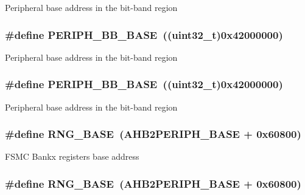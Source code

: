 Peripheral base address in the bit-\/band region \hypertarget{group___peripheral__memory__map_gaed7efc100877000845c236ccdc9e144a}{
\subsubsection[{P\-E\-R\-I\-P\-H\-\_\-\-B\-B\-\_\-\-B\-A\-S\-E}]{\setlength{\rightskip}{0pt plus 5cm}\#define P\-E\-R\-I\-P\-H\-\_\-\-B\-B\-\_\-\-B\-A\-S\-E~((uint32\-\_\-t)0x42000000)}}\label{group___peripheral__memory__map_gaed7efc100877000845c236ccdc9e144a}
Peripheral base address in the bit-\/band region \hypertarget{group___peripheral__memory__map_gaed7efc100877000845c236ccdc9e144a}{
\subsubsection[{P\-E\-R\-I\-P\-H\-\_\-\-B\-B\-\_\-\-B\-A\-S\-E}]{\setlength{\rightskip}{0pt plus 5cm}\#define P\-E\-R\-I\-P\-H\-\_\-\-B\-B\-\_\-\-B\-A\-S\-E~((uint32\-\_\-t)0x42000000)}}\label{group___peripheral__memory__map_gaed7efc100877000845c236ccdc9e144a}
Peripheral base address in the bit-\/band region \hypertarget{group___peripheral__memory__map_gab92662976cfe62457141e5b4f83d541c}{
\subsubsection[{R\-N\-G\-\_\-\-B\-A\-S\-E}]{\setlength{\rightskip}{0pt plus 5cm}\#define R\-N\-G\-\_\-\-B\-A\-S\-E~({\bf A\-H\-B2\-P\-E\-R\-I\-P\-H\-\_\-\-B\-A\-S\-E} + 0x60800)}}\label{group___peripheral__memory__map_gab92662976cfe62457141e5b4f83d541c}
F\-S\-M\-C Bankx registers base address \hypertarget{group___peripheral__memory__map_gab92662976cfe62457141e5b4f83d541c}{
\subsubsection[{R\-N\-G\-\_\-\-B\-A\-S\-E}]{\setlength{\rightskip}{0pt plus 5cm}\#define R\-N\-G\-\_\-\-B\-A\-S\-E~({\bf A\-H\-B2\-P\-E\-R\-I\-P\-H\-\_\-\-B\-A\-S\-E} + 0x60800)}}\label{group___peripheral__memory__map_gab92662976cfe62457141e5b4f83d541c}
